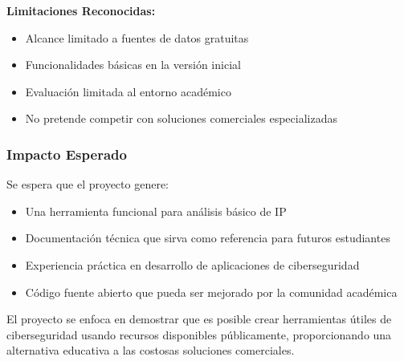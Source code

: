 \textbf{Limitaciones Reconocidas:}
\begin{itemize}
    \item Alcance limitado a fuentes de datos gratuitas
    \item Funcionalidades básicas en la versión inicial
    \item Evaluación limitada al entorno académico
    \item No pretende competir con soluciones comerciales especializadas
\end{itemize}

\subsubsection{Impacto Esperado}
Se espera que el proyecto genere:

\begin{itemize}
    \item Una herramienta funcional para análisis básico de IP
    \item Documentación técnica que sirva como referencia para futuros estudiantes
    \item Experiencia práctica en desarrollo de aplicaciones de ciberseguridad
    \item Código fuente abierto que pueda ser mejorado por la comunidad académica
\end{itemize}

El proyecto se enfoca en demostrar que es posible crear herramientas útiles de ciberseguridad usando recursos disponibles públicamente, proporcionando una alternativa educativa a las costosas soluciones comerciales.
